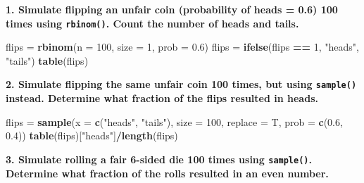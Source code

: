 \documentclass[]{book}
\newenvironment{Shaded}{\begin{snugshade}}{\end{snugshade}}
\newcommand{\DataTypeTok}[1]{\textcolor[rgb]{0.13,0.29,0.53}{#1}}
\newcommand{\DecValTok}[1]{\textcolor[rgb]{0.00,0.00,0.81}{#1}}
\newcommand{\FloatTok}[1]{\textcolor[rgb]{0.00,0.00,0.81}{#1}}
\newcommand{\KeywordTok}[1]{\textcolor[rgb]{0.13,0.29,0.53}{\textbf{#1}}}
\newcommand{\NormalTok}[1]{#1}
\newcommand{\OperatorTok}[1]{\textcolor[rgb]{0.81,0.36,0.00}{\textbf{#1}}}
\newcommand{\StringTok}[1]{\textcolor[rgb]{0.31,0.60,0.02}{#1}}
\begin{document}
\textbf{1. Simulate flipping an unfair coin (probability of heads = 0.6) 100 times using \texttt{rbinom()}. Count the number of heads and tails.}

\begin{Shaded}
\begin{Highlighting}[]
\NormalTok{flips =}\StringTok{ }\KeywordTok{rbinom}\NormalTok{(}\DataTypeTok{n =} \DecValTok{100}\NormalTok{, }\DataTypeTok{size =} \DecValTok{1}\NormalTok{, }\DataTypeTok{prob =} \FloatTok{0.6}\NormalTok{)}
\NormalTok{flips =}\StringTok{ }\KeywordTok{ifelse}\NormalTok{(flips }\OperatorTok{==}\StringTok{ }\DecValTok{1}\NormalTok{, }\StringTok{"heads"}\NormalTok{, }\StringTok{"tails"}\NormalTok{)}
\KeywordTok{table}\NormalTok{(flips)}
\end{Highlighting}
\end{Shaded}

\textbf{2. Simulate flipping the same unfair coin 100 times, but using \texttt{sample()} instead. Determine what fraction of the flips resulted in heads.}

\begin{Shaded}
\begin{Highlighting}[]
\NormalTok{flips =}\StringTok{ }\KeywordTok{sample}\NormalTok{(}\DataTypeTok{x =} \KeywordTok{c}\NormalTok{(}\StringTok{"heads"}\NormalTok{, }\StringTok{"tails"}\NormalTok{), }\DataTypeTok{size =} \DecValTok{100}\NormalTok{, }\DataTypeTok{replace =}\NormalTok{ T, }\DataTypeTok{prob =} \KeywordTok{c}\NormalTok{(}\FloatTok{0.6}\NormalTok{, }\FloatTok{0.4}\NormalTok{))}
\KeywordTok{table}\NormalTok{(flips)[}\StringTok{"heads"}\NormalTok{]}\OperatorTok{/}\KeywordTok{length}\NormalTok{(flips)}
\end{Highlighting}
\end{Shaded}

\textbf{3. Simulate rolling a fair 6-sided die 100 times using \texttt{sample()}. Determine what fraction of the rolls resulted in an even number.}

\begin{Shaded}
\end{Shaded}
\end{document}
